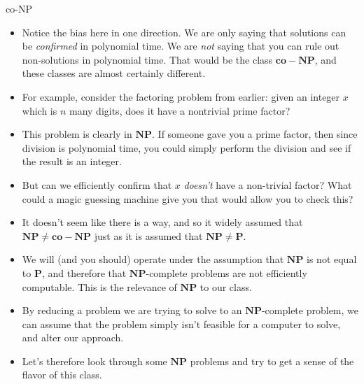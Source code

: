 \documentclass{beamer}
\begin{document}
\begin{frame}{co-NP}
    \begin{itemize}
        \item Notice the bias here in one direction. We are only saying that solutions can be \emph{confirmed} in polynomial time. We are \emph{not} saying that you can rule out non-solutions in polynomial time. That would be the class $\mathbf{co-NP}$, and these classes are almost certainly different. 
        \item For example, consider the factoring problem from earlier: given an integer $x$ which is $n$ many digits, does it have a nontrivial prime factor?
        \item This problem is clearly in $\mathbf{NP}$. If someone gave you a prime factor, then since division is polynomial time, you could simply perform the division and see if the result is an integer. \pause 
        \item But can we efficiently confirm that $x$ \emph{doesn't} have a non-trivial factor? What could a magic guessing machine give you that would allow you to check this? \pause 
        \item It doesn't seem like there is a way, and so it widely assumed that $\mathbf{NP} \neq \mathbf{co-NP}$ just as it is assumed that $\mathbf{NP} \neq \mathbf{P}$. 
    \end{itemize}
\end{frame}

\begin{itemize}{Problems in $\mathbf{NP}$}
    \item We will (and you should) operate under the assumption that $\mathbf{NP}$ is not equal to $\mathbf{P}$, and therefore that $\mathbf{NP}$-complete problems are not efficiently computable. This is the relevance of $\mathbf{NP}$ to our class. \pause 
    \item By reducing a problem we are trying to solve to an $\mathbf{NP}$-complete problem, we can assume that the problem simply isn't feasible for a computer to solve, and alter our approach. \pause  
    \item Let's therefore look through some $\mathbf{NP}$ problems and try to get a sense of the flavor of this class. 
\end{itemize}
\end{document}
